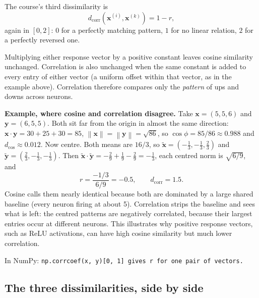 \documentclass[11pt]{article}
\newcommand{\vx}{\bm{x}}
\newcommand{\vy}{\bm{y}}
\newcommand{\norm}[1]{\left\lVert #1 \right\rVert}
\newcommand{\dcos}{d_{\cos}}
\newcommand{\dcorr}{d_{\mathrm{corr}}}
\newcommand{\np}[1]{{\small\color{lightgray}In NumPy: \texttt{#1}}\par}
\begin{document}
The course's third dissimilarity is
\[
\dcorr(\vx^{(i)}, \vx^{(k)}) = 1 - r ,
\]
again in $[0, 2]$: $0$ for a perfectly matching pattern, $1$ for no linear relation, $2$
for a perfectly reversed one.

\begin{keybox}
 Multiplying either response vector by a positive constant leaves cosine
similarity unchanged. Correlation is also unchanged when the same constant is added to
every entry of either vector (a uniform offset within that vector, as in the example
above). Correlation therefore compares only the \emph{pattern} of ups and downs across
neurons.
\end{keybox}

\textbf{Example, where cosine and correlation disagree.} Take $\vx = (5, 5, 6)$ and
$\vy = (6, 5, 5)$. Both sit far from the origin in almost the same direction:
$\vx \cdot \vy = 30 + 25 + 30 = 85$, $\norm{\vx} = \norm{\vy} = \sqrt{86}$, so
$\cos\phi = 85/86 \approx 0.988$ and $\dcos \approx 0.012$. Now centre. Both means are
$16/3$, so
$\tilde{\vx} = (-\tfrac13, -\tfrac13, \tfrac23)$ and
$\tilde{\vy} = (\tfrac23, -\tfrac13, -\tfrac13)$. Then
$\tilde{\vx} \cdot \tilde{\vy} = -\tfrac29 + \tfrac19 - \tfrac29 = -\tfrac13$, each centred
norm is $\sqrt{6/9}$, and
\[
r = \frac{-1/3}{6/9} = -0.5, \qquad \dcorr = 1.5 .
\]
Cosine calls them nearly identical because both are dominated by a large shared baseline
(every neuron firing at about 5). Correlation strips the baseline and sees what is left:
the centred patterns are negatively correlated, because their largest entries occur at
different neurons. This illustrates why positive response vectors, such as ReLU
activations, can have high cosine similarity but much lower correlation.

\np{np.corrcoef(x, y)[0, 1] gives r for one pair of vectors.}

\subsection{The three dissimilarities, side by side}
\end{document}
